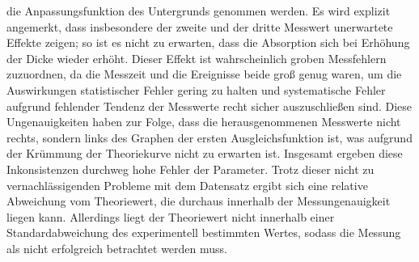 die Anpassungsfunktion des Untergrunds genommen werden. Es wird explizit angemerkt, dass insbesondere
der zweite und der dritte Messwert unerwartete Effekte zeigen; so ist es nicht zu erwarten, dass
die Absorption sich bei Erhöhung der Dicke wieder erhöht. Dieser Effekt ist wahrscheinlich groben
Messfehlern zuzuordnen, da die Messzeit und die Ereignisse beide groß genug waren, um die Auswirkungen
statistischer Fehler gering zu halten und systematische Fehler aufgrund fehlender Tendenz der Messwerte
recht sicher auszuschließen sind. Diese Ungenauigkeiten haben zur Folge, dass die herausgenommenen Messwerte
nicht rechts, sondern links des Graphen der ersten Ausgleichsfunktion ist, was aufgrund der Krümmung
der Theoriekurve nicht zu erwarten ist. Insgesamt ergeben diese Inkonsistenzen durchweg hohe
Fehler der Parameter. Trotz dieser nicht zu vernachlässigenden Probleme mit dem Datensatz
ergibt sich eine relative Abweichung vom Theoriewert, die durchaus innerhalb der Messungenauigkeit liegen kann. Allerdings
liegt der Theoriewert nicht innerhalb einer Standardabweichung des experimentell bestimmten
Wertes, sodass die Messung als nicht erfolgreich betrachtet werden muss.
